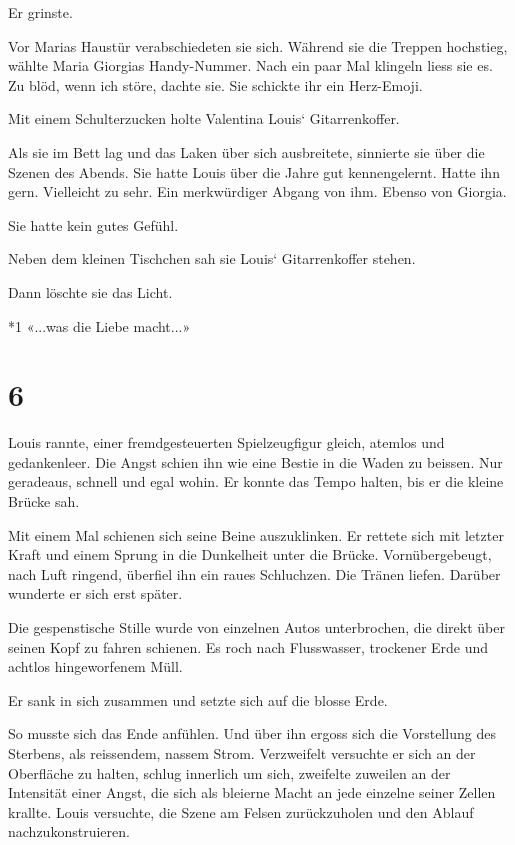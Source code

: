 Er grinste.

Vor Marias Haustür verabschiedeten sie sich. Während sie die Treppen
hochstieg, wählte Maria Giorgias Handy-Nummer. Nach ein paar Mal
klingeln liess sie es. Zu blöd, wenn ich störe, dachte sie. Sie schickte
ihr ein Herz-Emoji.

Mit einem Schulterzucken holte Valentina Louis` Gitarrenkoffer.

Als sie im Bett lag und das Laken über sich ausbreitete, sinnierte sie
über die Szenen des Abends. Sie hatte Louis über die Jahre gut
kennengelernt. Hatte ihn gern. Vielleicht zu sehr. Ein merkwürdiger
Abgang von ihm. Ebenso von Giorgia.

Sie hatte kein gutes Gefühl.

Neben dem kleinen Tischchen sah sie Louis` Gitarrenkoffer stehen.

Dann löschte sie das Licht.

*1 «...was die Liebe macht...»

\chapter{6}\label{section-5}

Louis rannte, einer fremdgesteuerten Spielzeugfigur gleich, atemlos und
gedankenleer. Die Angst schien ihn wie eine Bestie in die Waden zu
beissen. Nur geradeaus, schnell und egal wohin. Er konnte das Tempo
halten, bis er die kleine Brücke sah.

Mit einem Mal schienen sich seine Beine auszuklinken. Er rettete sich
mit letzter Kraft und einem Sprung in die Dunkelheit unter die Brücke.
Vornübergebeugt, nach Luft ringend, überfiel ihn ein raues Schluchzen.
Die Tränen liefen. Darüber wunderte er sich erst später.

Die gespenstische Stille wurde von einzelnen Autos unterbrochen, die
direkt über seinen Kopf zu fahren schienen. Es roch nach Flusswasser,
trockener Erde und achtlos hingeworfenem Müll.

Er sank in sich zusammen und setzte sich auf die blosse Erde.

So musste sich das Ende anfühlen. Und über ihn ergoss sich die
Vorstellung des Sterbens, als reissendem, nassem Strom. Verzweifelt
versuchte er sich an der Oberfläche zu halten, schlug innerlich um sich,
zweifelte zuweilen an der Intensität einer Angst, die sich als bleierne
Macht an jede einzelne seiner Zellen krallte. Louis versuchte, die Szene
am Felsen zurückzuholen und den Ablauf nachzukonstruieren.

